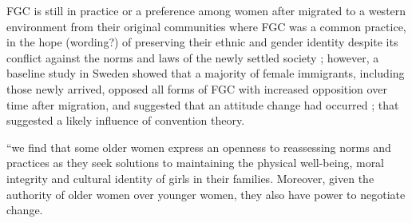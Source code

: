 \documentclass[12pt,]{article}
\newcommand{\comment}[1]{\textbf{[[#1]]}}
\newcommand{\cfcmt}[1]{\comment{CFS: #1}}
\begin{document}
FGC is still in practice or a preference among women after migrated to a western environment from their original communities where FGC was a common practice, in the hope (wording?) of preserving their ethnic and gender identity despite its conflict against the  norms and laws of the newly settled society \cite{}; however, a baseline study in Sweden showed that a majority of female immigrants, including those newly arrived, opposed all forms of FGC with increased opposition over time after migration, and suggested that an attitude change had occurred \cite{WahlJohn17}; that suggested a likely influence of convention theory.




“we find that some older women express an openness to reassessing norms and practices as they seek solutions to maintaining the physical well-being, moral integrity and cultural identity of girls in their families. Moreover, given the authority of older women over younger women, they also have power to negotiate change.\cite{ShelMore18}

\end{document}
